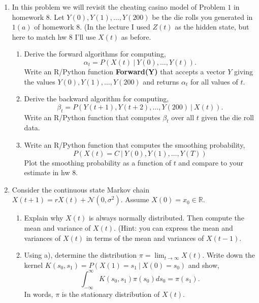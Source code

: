\documentclass{article}
\begin{document}
\begin{enumerate} 

\item  In this problem we will revisit the cheating casino model of Problem $1$ in homework $8$.  Let $Y(0), Y(1), \dots, Y(200)$ be the die rolls you generated in $1(a)$ of homework $8$.   (In the lecture I used $Z(t)$ as the hidden state, but here to match hw $8$ I'll use $X(t)$ as before.
\begin{enumerate}
\item Derive the forward  algorithms for computing,
\begin{equation}
\alpha_t = P(X(t) \ | \ Y(0), \dots, Y(t)).  
\end{equation}
 Write an R/Python function \textbf{Forward(Y)} that accepts a vector $Y$ giving the values $Y(0), Y(1), \dots, Y(200)$ and returns $\alpha_t$ for all values of $t$.
\item Derive the backward algorithm for computing,
\begin{equation} 
\beta_t = P(Y(t+1), Y(t+2), \dots, Y(200) \ | \ X(t)).
\end{equation}   
Write an R/Python function that computes $\beta_t$ over all $t$ given the die roll data.  
\item Write an R/Python function that computes the smoothing probability,
\begin{equation}
P(X(t) = C \ | \ Y(0),  Y(1) ,\dots, Y(T))
\end{equation}
Plot the smoothing probability as a function of $t$ and compare to your estimate in hw $8$.  
\end{enumerate}

\item Consider the continuous state Markov chain $X(t+1) = r X(t) + \mathcal{N}(0, \sigma^2)$.  Assume $X(0) =x_0 \in \mathbb{R}$.
\begin{enumerate}
\item Explain why $X(t)$ is always normally distributed.  Then compute the mean and variance of $X(t)$. (Hint:  you can express the mean and variances of $X(t)$ in terms of the mean and variances of $X(t-1)$.
\item Using a), determine the distribution $\pi = \lim_{t \to \infty} X(t)$.  Write down the kernel $K(s_0, s_1) = P(X(1) = s_1 \ | \ X(0) = s_0)$ and show,
\begin{equation}
\int_{-\infty}^\infty K(s_0, s_1) \pi(s_0) ds_0 = \pi(s_1).
\end{equation}
In words, $\pi$ is the stationary distribution of $X(t)$.  
\end{enumerate}



\end{enumerate}
\end{document}
